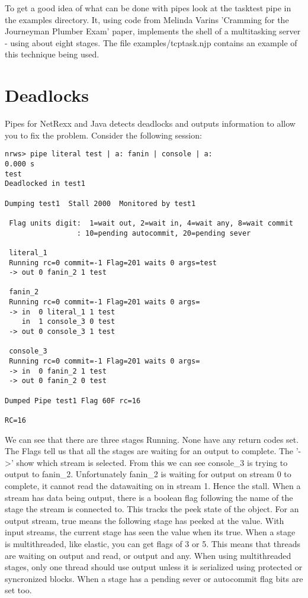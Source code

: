 To get a good idea of what can be done with pipes look at the tasktest pipe in the examples directory.  It, using code from Melinda Varins 'Cramming for the Journeyman Plumber Exam' paper,  implements the shell of a  multitasking server - using about eight stages.  The file examples/tcptask.njp contains an example of this technique being used.

\chapter{Deadlocks}
Pipes for NetRexx and Java detects deadlocks and outputs information to allow you to fix the problem.  Consider the following session:
\begin{verbatim}
nrws> pipe literal test | a: fanin | console | a:                                                                       0.000 s
test
Deadlocked in test1

Dumping test1  Stall 2000  Monitored by test1

 Flag units digit:  1=wait out, 2=wait in, 4=wait any, 8=wait commit
                 : 10=pending autocommit, 20=pending sever

 literal_1
 Running rc=0 commit=-1 Flag=201 waits 0 args=test
 -> out 0 fanin_2 1 test

 fanin_2
 Running rc=0 commit=-1 Flag=201 waits 0 args=
 -> in  0 literal_1 1 test
    in  1 console_3 0 test
 -> out 0 console_3 1 test

 console_3
 Running rc=0 commit=-1 Flag=201 waits 0 args=
 -> in  0 fanin_2 1 test
 -> out 0 fanin_2 0 test

Dumped Pipe test1 Flag 60F rc=16

RC=16
\end{verbatim}

We can see that there are three stages Running.  None have any return codes set.  The Flags tell us that all the stages are waiting for an output to complete.  The '->' show which stream is selected.  From this we can see console\_3 is trying to output to fanin\_2. Unfortunately fanin\_2 is waiting for output on stream 0 to complete, it cannot read the datawaiting on in stream 1.  Hence the stall.
When a stream has data being output, there is a boolean flag following the name of the stage the stream is connected to. This tracks the peek state of the object.  For an output stream, true means the following stage has peeked at the value. With input streams, the current stage has seen the value when its true.
When a stage is multithreaded, like elastic, you can get flags of 3 or 5. This means that threads are waiting on output and read, or output and any. When using multithreaded stages, only one thread should use output unless it is serialized using protected or syncronized blocks.
When a stage has a pending sever or autocommit flag bits are set too.

